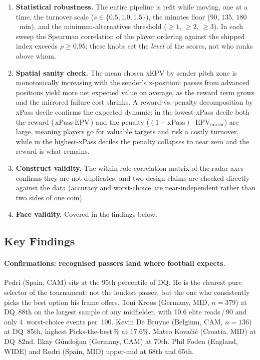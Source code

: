 \documentclass[12pt,a4paper]{article}
\begin{document}
\begin{enumerate}
    \item \textbf{Statistical robustness.} The entire pipeline is refit while moving, one at a time, the turnover scale ($s \in \{0.5, 1.0, 1.5\}$), the minutes floor ($90$, $135$, $180$~min), and the minimum-alternatives threshold ($\geq 1$, $\geq 2$, $\geq 3$). In each sweep the Spearman correlation of the player ordering against the shipped index exceeds $\rho \geq 0.95$: these knobs set the \emph{level} of the scores, not who ranks above whom.
    \item \textbf{Spatial sanity check.} The mean chosen xEPV by sender pitch zone is monotonically increasing with the sender's x-position: passes from advanced positions yield more net expected value on average, as the reward term grows and the mirrored failure cost shrinks. A reward-vs.-penalty decomposition by xPass decile confirms the expected dynamic: in the lowest-xPass decile both the reward ($\text{xPass} \cdot \text{EPV}$) and the penalty ($(1 - \text{xPass}) \cdot \text{EPV}_{\text{mirror}}$) are large, meaning players go for valuable targets and risk a costly turnover, while in the highest-xPass deciles the penalty collapses to near zero and the reward is what remains.
    \item \textbf{Construct validity.} The within-role correlation matrix of the radar axes confirms they are not duplicates, and two design claims are checked directly against the data (accuracy and worst-choice are near-independent rather than two sides of one coin).
    \item \textbf{Face validity.} Covered in the findings below.
\end{enumerate}

\subsection{Key Findings}\label{sec:h2-findings}

\paragraph{Confirmations: recognised passers land where football expects.}
Pedri (Spain, CAM) sits at the 95th percentile of DQ. He is the clearest pure selector of the tournament: not the loudest passer, but the one who consistently picks the best option his frame offers.
Toni Kroos (Germany, MID, $n=379$) at DQ~88th on the largest sample of any midfielder, with 10.6 elite reads\,/\,90 and only 4~worst-choice events per~100.
Kevin De Bruyne (Belgium, CAM, $n=136$) at DQ~85th, highest Picks-the-best\,\% at 17.6\%.
Mateo Kova\v{c}i\'{c} (Croatia, MID) at DQ~82nd.
\.{I}lkay G\"{u}ndoğan (Germany, CAM) at 70th.
Phil Foden (England, WIDE) and Rodri (Spain, MID) upper-mid at 68th and 65th.
\end{document}
